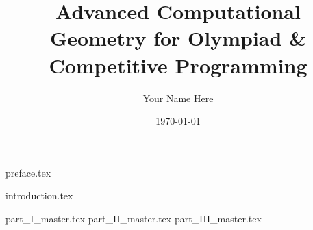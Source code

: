 \documentclass[11pt, oneside]{book}
\begin{document}
\title{Advanced Computational Geometry for Olympiad \& Competitive Programming}
\author{Your Name Here} %
\date{\today}
\maketitle

\frontmatter %

{preface.tex}
\cleardoublepage

{introduction.tex}
\cleardoublepage

\tableofcontents
\cleardoublepage

\mainmatter %

{part_I_master.tex}
{part_II_master.tex}
{part_III_master.tex}



\end{document}
